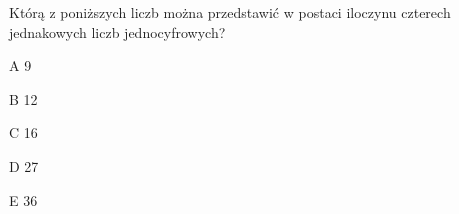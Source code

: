 \begin{tresc}
Którą z poniższych liczb można przedstawić w postaci iloczynu czterech jednakowych liczb jednocyfrowych?
\end{tresc}
\begin{wariant}{A} 9 \end{wariant}
\begin{wariant}{B} 12 \end{wariant}
\begin{wariant}{C} 16 \end{wariant}
\begin{wariant}{D} 27 \end{wariant}
\begin{wariant}{E} 36 \end{wariant}

